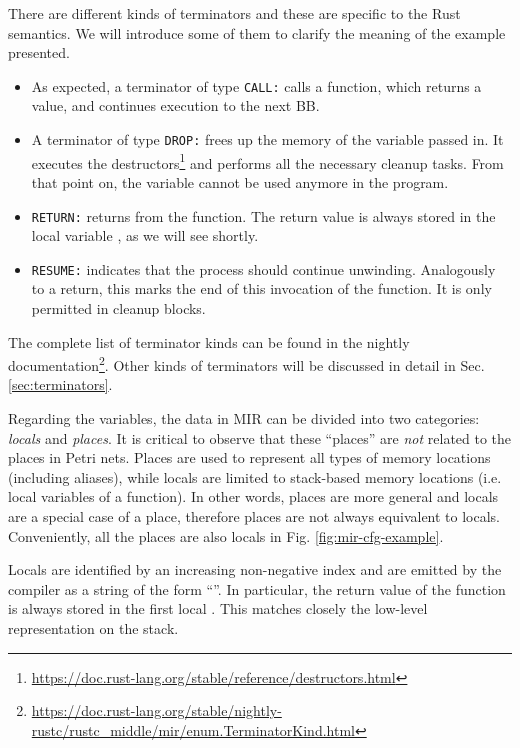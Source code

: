 \documentclass[../Thesis.tex]{subfiles}
\begin{document}
There are different kinds of terminators and these are specific to the Rust semantics.
We will introduce some of them to clarify the meaning of the example presented.

\begin{itemize}
    \item As expected, a terminator of type \texttt{CALL:} calls a function, which returns a value,
          and continues execution to the next \acrshort{BB}.
    \item A terminator of type \texttt{DROP:} frees up the memory of the variable passed in.
          It executes the destructors\footnote{\url{https://doc.rust-lang.org/stable/reference/destructors.html}}
          and performs all the necessary cleanup tasks.
          From that point on, the variable cannot be used anymore in the program.
    \item \texttt{RETURN:} returns from the function.
          The return value is always stored in the local variable , as we will see shortly.
    \item \texttt{RESUME:} indicates that the process should continue unwinding.
          Analogously to a return, this marks the end of this invocation of the function.
          It is only permitted in cleanup blocks.
\end{itemize}

The complete list of terminator kinds can be found in the nightly
documentation\footnote{\url{https://doc.rust-lang.org/stable/nightly-rustc/rustc_middle/mir/enum.TerminatorKind.html}}.
Other kinds of terminators will be discussed in detail in Sec. \ref{sec:terminators}.

Regarding the variables, the data in MIR can be divided into two categories:
\emph{locals} and \emph{places}.
It is critical to observe that these ``places'' are
\emph{not} related to the places in Petri nets.
Places are used to represent all types of memory locations (including aliases),
while locals are limited to stack-based memory locations
(i.e. local variables of a function).
In other words, places are more general and locals are a special case of a place,
therefore places are not always equivalent to locals.
Conveniently, all the places are also locals in Fig. \ref{fig:mir-cfg-example}.

Locals are identified by an increasing non-negative index
and are emitted by the compiler as a string of the form ``''.
In particular, the return value of the function
is always stored in the first local .
This matches closely the low-level representation on the stack.
\end{document}
